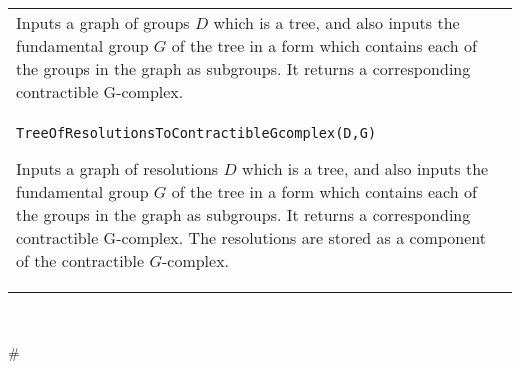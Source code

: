 \documentclass[a4paper,11pt]{report}
\begin{document}
{\begin{center}
\begin{tabular}{|l|}
 Inputs a graph of groups $D$ which is a tree, and also inputs the fundamental group $G$ of the tree in a form which contains each of the groups in the graph as
subgroups. It returns a corresponding contractible G-complex. \\
 \index{TreeOfResolutionsToContractibleGcomplex} \texttt{TreeOfResolutionsToContractibleGcomplex(D,G) } 

 Inputs a graph of resolutions $D$ which is a tree, and also inputs the fundamental group $G$ of the tree in a form which contains each of the groups in the graph as
subgroups. It returns a corresponding contractible G-complex. The resolutions
are stored as a component of the contractible $G$-complex. \\
\end{tabular}\\[2mm]
\end{center}

 }

 \# 
\end{document}
